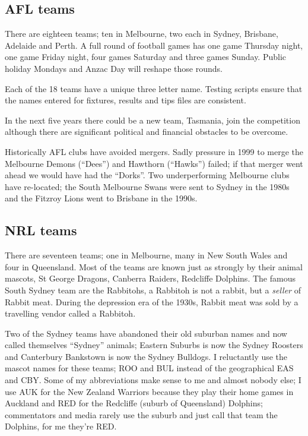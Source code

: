 \documentclass{article}
\begin{document}
\subsection{AFL teams}

There are eighteen teams; ten in Melbourne, two each in Sydney, Brisbane,
Adelaide and Perth. A full round of football games has one game
Thursday night, one game Friday night, four games Saturday and three
games Sunday. Public holiday Mondays and Anzac Day will reshape those
rounds.

Each of the 18 teams have a unique three letter name. Testing scripts
ensure that the names entered for fixtures, results and tips files are
consistent.

In the next five years there could be a new team, Tasmania, join the
competition although there are significant political and financial
obstacles to be overcome.

Historically AFL clubs have avoided mergers. Sadly pressure in 1999 to
merge the Melbourne Demons (``Dees'') and Hawthorn (``Hawks'')
failed; if that merger went ahead we would have had the ``Dorks''.
Two underperforming Melbourne clubs have re-located; the South
Melbourne Swans were sent to Sydney in the 1980s and the Fitzroy Lions
went to Brisbane in the 1990s.

\subsection{NRL teams}

There are seventeen teams; one in Melbourne, many in New South Wales
and four in Queensland. Most of the teams are known just as strongly
by their animal mascots, St George Dragons, Canberra Raiders,
Redcliffe Dolphins. The famous South Sydney team are the Rabbitohs, a
Rabbitoh is not a rabbit, but a \textit{seller} of Rabbit meat. During
the depression era of the 1930s, Rabbit meat was sold by a travelling
vendor called a Rabbitoh.

Two of the Sydney teams have abandoned their old suburban names
and now called themselves ``Sydney'' animals; Eastern Suburbs is now
the Sydney Roosters and Canterbury Bankstown is now the Sydney
Bulldogs. I reluctantly use the mascot names for these teams; ROO and
BUL instead of the geographical EAS and CBY. Some of my abbreviations
make sense to me and almost nobody else; I use AUK for the New Zealand
Warriors because they play their home games in Auckland and RED for
the Redcliffe (suburb of Queensland) Dolphins; commentators and media
rarely use the suburb and just call that team the Dolphins, for me
they're RED.
\end{document}
